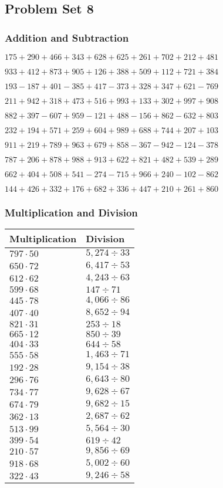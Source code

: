 \hypertarget{problem-set-8-2}{%
\subsection{Problem Set 8}\label{problem-set-8-2}}

\hypertarget{addition-and-subtraction-108}{%
\subsubsection{Addition and
Subtraction}\label{addition-and-subtraction-108}}

\(175 + 290 + 466 + 343 + 628 + 625 + 261 + 702 + 212 + 481\)

\(933 + 412 + 873 + 905 + 126 + 388 + 509 + 112 + 721 + 384\)

\(193 - 187 + 401 - 385 + 417 - 373 + 328 + 347 + 621 - 769\)

\(211 + 942 + 318 + 473 + 516 + 993 + 133 + 302 + 997 + 908\)

\(882 + 397 - 607 + 959 - 121 + 488 - 156 + 862 - 632 + 803\)

\(232 + 194 + 571 + 259 + 604 + 989 + 688 + 744 + 207 + 103\)

\(911 + 219 + 789 + 963 + 679 + 858 - 367 - 942 - 124 - 378\)

\(787 + 206 + 878 + 988 + 913 + 622 + 821 + 482 + 539 + 289\)

\(662 + 404 + 508 + 541 - 274 - 715 + 966 + 240 - 102 - 862\)

\(144 + 426 + 332 + 176 + 682 + 336 + 447 + 210 + 261 + 860\)

\hypertarget{multiplication-and-division-108}{%
\subsubsection{Multiplication and
Division}\label{multiplication-and-division-108}}

\begin{longtable}[]{@{}ll@{}}
\toprule
Multiplication & Division\tabularnewline
\midrule
\endhead
\(797 \cdot 50\) & \(5,274÷33\)\tabularnewline
\(650 \cdot 72\) & \(6,417÷53\)\tabularnewline
\(612 \cdot 62\) & \(4,243÷63\)\tabularnewline
\(599 \cdot 68\) & \(147÷71\)\tabularnewline
\(445 \cdot 78\) & \(4,066÷86\)\tabularnewline
\(407 \cdot 40\) & \(8,652÷94\)\tabularnewline
\(821 \cdot 31\) & \(253÷18\)\tabularnewline
\(665 \cdot 12\) & \(850÷39\)\tabularnewline
\(404 \cdot 33\) & \(644÷58\)\tabularnewline
\(555 \cdot 58\) & \(1,463÷71\)\tabularnewline
\(192 \cdot 28\) & \(9,154÷38\)\tabularnewline
\(296 \cdot 76\) & \(6,643÷80\)\tabularnewline
\(734 \cdot 77\) & \(9,628÷67\)\tabularnewline
\(674 \cdot 79\) & \(9,682÷15\)\tabularnewline
\(362 \cdot 13\) & \(2,687÷62\)\tabularnewline
\(513 \cdot 99\) & \(5,564÷30\)\tabularnewline
\(399 \cdot 54\) & \(619÷42\)\tabularnewline
\(210 \cdot 57\) & \(9,856÷69\)\tabularnewline
\(918 \cdot 68\) & \(5,002÷60\)\tabularnewline
\(322 \cdot 43\) & \(9,246÷58\)\tabularnewline
\bottomrule
\end{longtable}

